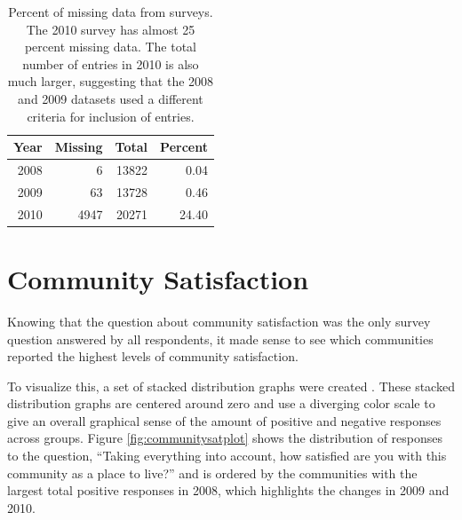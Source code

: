 \documentclass[smallextended]{svjour3}\usepackage[]{graphicx}\usepackage[]{color}
\begin{document}
\begin{table}[ht]
\centering
\begin{tabular}{rrrr}
  \hline
Year & Missing & Total & Percent \\ 
  \hline
2008 &   6 & 13822 & 0.04 \\ 
  2009 &  63 & 13728 & 0.46 \\ 
  2010 & 4947 & 20271 & 24.40 \\ 
   \hline
\end{tabular}
\caption{Percent of missing data from surveys. The 2010 survey has almost 25 percent missing data. The total number of entries in 2010 is also much larger, suggesting that the 2008 and 2009 datasets used a different criteria for inclusion of entries.} 
\label{missingtable}
\end{table}


\section{Community Satisfaction}
\label{communittsatsec}
Knowing that the question about community satisfaction was the only survey question answered by all respondents, it made sense to see which communities reported the highest levels of community satisfaction. 

To visualize this, a set of stacked distribution graphs were created \citep{RobHei2011}. These stacked distribution graphs are centered around zero and use a diverging color scale to give an overall graphical sense of the amount of positive and negative responses across groups. Figure \ref{fig:communitysatplot} shows the distribution of responses to the question, ``Taking everything into account, how satisfied are you with this community as a place to live?'' and is ordered by the communities with the largest total positive responses in 2008, which highlights the changes in 2009 and 2010. 
\end{document}
